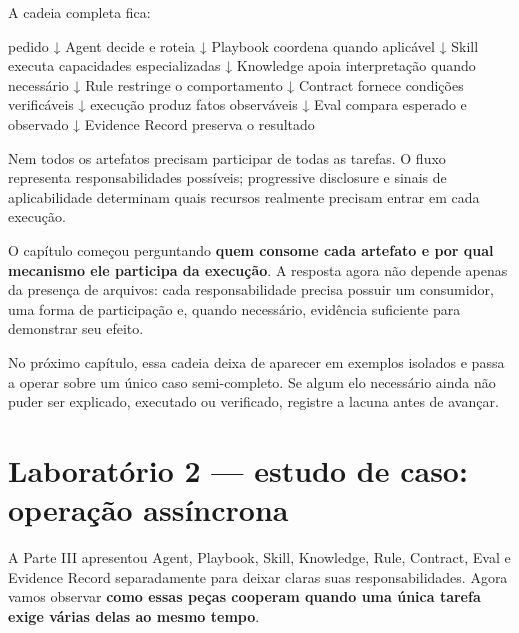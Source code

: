 \documentclass[
  10pt,
  a4paper,
  oneside]{book}
\newenvironment{Shaded}{}{}
\newcommand{\NormalTok}[1]{#1}
\renewenvironment{Shaded}{\begin{snugshade}}{\end{snugshade}}%
\begin{document}
A cadeia completa fica:

\begin{Shaded}
\begin{Highlighting}[]
\NormalTok{pedido}
\NormalTok{  ↓}
\NormalTok{Agent decide e roteia}
\NormalTok{  ↓}
\NormalTok{Playbook coordena quando aplicável}
\NormalTok{  ↓}
\NormalTok{Skill executa capacidades especializadas}
\NormalTok{  ↓}
\NormalTok{Knowledge apoia interpretação quando necessário}
\NormalTok{  ↓}
\NormalTok{Rule restringe o comportamento}
\NormalTok{  ↓}
\NormalTok{Contract fornece condições verificáveis}
\NormalTok{  ↓}
\NormalTok{execução produz fatos observáveis}
\NormalTok{  ↓}
\NormalTok{Eval compara esperado e observado}
\NormalTok{  ↓}
\NormalTok{Evidence Record preserva o resultado}
\end{Highlighting}
\end{Shaded}

Nem todos os artefatos precisam participar de todas as tarefas. O fluxo
representa responsabilidades possíveis; progressive disclosure e sinais
de aplicabilidade determinam quais recursos realmente precisam entrar em
cada execução.

O capítulo começou perguntando \textbf{quem consome cada artefato e por
qual mecanismo ele participa da execução}. A resposta agora não depende
apenas da presença de arquivos: cada responsabilidade precisa possuir um
consumidor, uma forma de participação e, quando necessário, evidência
suficiente para demonstrar seu efeito.

No próximo capítulo, essa cadeia deixa de aparecer em exemplos isolados
e passa a operar sobre um único caso semi-completo. Se algum elo
necessário ainda não puder ser explicado, executado ou verificado,
registre a lacuna antes de avançar.

\newpage

\hypertarget{laboratuxf3rio-2-estudo-de-caso-operauxe7uxe3o-assuxedncrona}{%
\chapter{Laboratório 2 --- estudo de caso: operação
assíncrona}\label{laboratuxf3rio-2-estudo-de-caso-operauxe7uxe3o-assuxedncrona}}

A Parte III apresentou Agent, Playbook, Skill, Knowledge, Rule,
Contract, Eval e Evidence Record separadamente para deixar claras suas
responsabilidades. Agora vamos observar \textbf{como essas peças
cooperam quando uma única tarefa exige várias delas ao mesmo tempo}.
\end{document}
